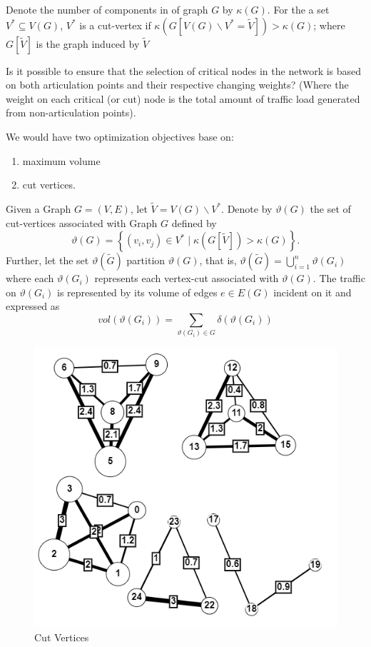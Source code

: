 Denote the number of components in of graph $G$ by $\kappa(G)$. For the a set $V^* \subseteq V(G)$, $V^*$ is a cut-vertex
if $\kappa(G[V(G)\backslash V^* = \tilde{V} ]) > \kappa(G)$; where  $G[\tilde{V}]$ is the graph induced by $\tilde{V}$

\begin{question}
  \label{pythagorean}
  Is it possible to ensure that the selection of critical nodes in the network is based on both articulation points and their respective changing weights?
  (Where the weight on each critical (or cut) node is the total amount of traffic load generated from non-articulation points).
\end{question}

\begin{approach}
  We would have two optimization objectives base on:
  \begin{enumerate}
    \item maximum volume
    \item cut vertices.
  \end{enumerate}
\end{approach}


\begin{problem}
Given a Graph $G = (V, E)$, let $ \tilde{V} = V(G)\backslash V^*$. Denote by $\vartheta (G)$ the set of cut-vertices associated with Graph $G$ defined by
\begin{equation}
  \vartheta (G) =\left\{(v_i, v_j)\in V^* \; \vert \; \kappa(G[\tilde{V} ]) > \kappa(G)\right\}.
\end{equation}
Further, let the set $\vartheta (\tilde{G} )$ partition  $\vartheta (G)$, that is,
$\vartheta (\tilde{G}) = \bigcup_{i=1}^n \vartheta (G_i)$ where each  $\vartheta (G_i)$ represents each
vertex-cut associated with $\vartheta (G)$. The traffic on $\vartheta (G_i)$ is represented by its volume
of edges $e \in E(G)$
incident on it and expressed as
\begin{equation}
  vol(\vartheta (G_i)) = \sum_{\vartheta (G_i)\in G} \delta(\vartheta (G_i))
\end{equation}

\end{problem}

\begin{figure}[htb!]
  \centering \includegraphics[width=\textwidth]{figures/cut_sample_2.png}
  \caption{Cut Vertices}
  \label{fig:cdnp}
\end{figure}